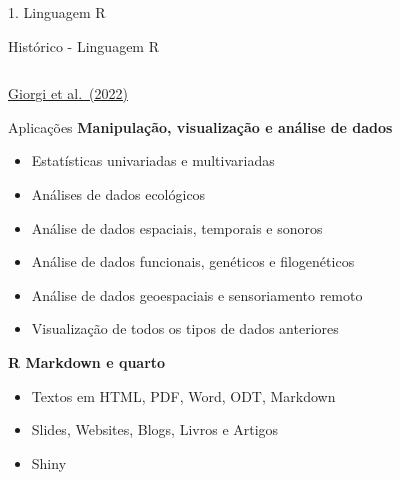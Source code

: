 \documentclass[
  ignorenonframetext,
]{beamer}
\providecommand{\tightlist}{%
  \setlength{\itemsep}{0pt}\setlength{\parskip}{0pt}}\usepackage{longtable,booktabs,array}
\begin{document}
\begin{frame}{1. Linguagem R}
\begin{block}{Histórico - Linguagem R}
\protect\hypertarget{histuxf3rico---linguagem-r-1}{}
\begin{columns}[T]
\begin{column}{0.5\textwidth}
\end{column}

\begin{column}{0.5\textwidth}
\end{column}
\end{columns}

\href{https://doi.org/10.3390/life12050648}{Giorgi et al.~(2022)}
\end{block}

\begin{block}{Aplicações}
\protect\hypertarget{aplicauxe7uxf5es}{}
\textbf{Manipulação, visualização e análise de dados}

\begin{itemize}
\tightlist
\item
  Estatísticas univariadas e multivariadas
\item
  Análises de dados ecológicos
\item
  Análise de dados espaciais, temporais e sonoros
\item
  Análise de dados funcionais, genéticos e filogenéticos
\item
  Análise de dados geoespaciais e sensoriamento remoto
\item
  Visualização de todos os tipos de dados anteriores
\end{itemize}

\textbf{R Markdown e quarto}

\begin{itemize}
\tightlist
\item
  Textos em HTML, PDF, Word, ODT, Markdown
\item
  Slides, Websites, Blogs, Livros e Artigos
\item
  Shiny
\end{itemize}


\end{block}
\end{frame}
\end{document}
